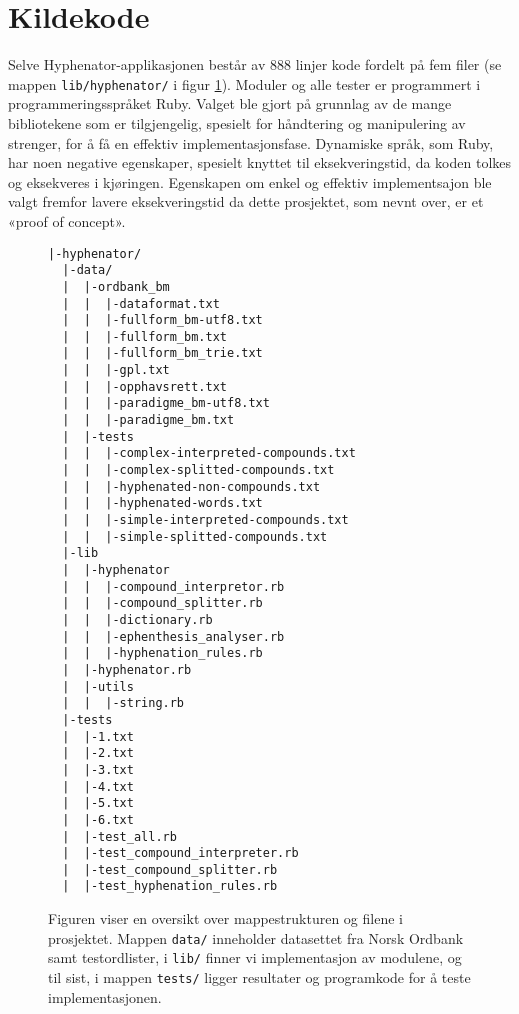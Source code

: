 \section{Kildekode}
\label{sec:kildekode}

Selve Hyphenator-applikasjonen består av 888 linjer kode fordelt på fem filer (se mappen \texttt{lib/hyphenator/} i figur \ref{fig:source-code}). Moduler og alle tester er programmert i programmeringsspråket Ruby. Valget ble gjort på grunnlag av de mange bibliotekene som er tilgjengelig, spesielt for håndtering og manipulering av strenger, for å få en effektiv implementasjonsfase. Dynamiske språk, som Ruby, har noen negative egenskaper, spesielt knyttet til eksekveringstid, da koden tolkes og eksekveres i kjøringen. Egenskapen om enkel og effektiv implementsajon ble valgt fremfor lavere eksekveringstid da dette prosjektet, som nevnt over, er et «proof of concept».

\begin{figure}
\begin{verbatim}
|-hyphenator/
  |-data/
  |  |-ordbank_bm
  |  |  |-dataformat.txt
  |  |  |-fullform_bm-utf8.txt
  |  |  |-fullform_bm.txt
  |  |  |-fullform_bm_trie.txt
  |  |  |-gpl.txt
  |  |  |-opphavsrett.txt
  |  |  |-paradigme_bm-utf8.txt
  |  |  |-paradigme_bm.txt
  |  |-tests
  |  |  |-complex-interpreted-compounds.txt
  |  |  |-complex-splitted-compounds.txt
  |  |  |-hyphenated-non-compounds.txt
  |  |  |-hyphenated-words.txt
  |  |  |-simple-interpreted-compounds.txt
  |  |  |-simple-splitted-compounds.txt
  |-lib
  |  |-hyphenator
  |  |  |-compound_interpretor.rb
  |  |  |-compound_splitter.rb
  |  |  |-dictionary.rb
  |  |  |-ephenthesis_analyser.rb
  |  |  |-hyphenation_rules.rb
  |  |-hyphenator.rb
  |  |-utils
  |  |  |-string.rb
  |-tests
  |  |-1.txt
  |  |-2.txt
  |  |-3.txt
  |  |-4.txt
  |  |-5.txt
  |  |-6.txt
  |  |-test_all.rb
  |  |-test_compound_interpreter.rb
  |  |-test_compound_splitter.rb
  |  |-test_hyphenation_rules.rb
\end{verbatim}
\caption[Filstrukturen i Hyphenator-prosjektet]{Figuren viser en oversikt over mappestrukturen og filene i prosjektet. Mappen \texttt{data/} inneholder datasettet fra Norsk Ordbank samt testordlister, i \texttt{lib/} finner vi implementasjon av modulene, og til sist, i mappen \texttt{tests/} ligger resultater og programkode for å teste implementasjonen.}
\label{fig:source-code}
\end{figure}